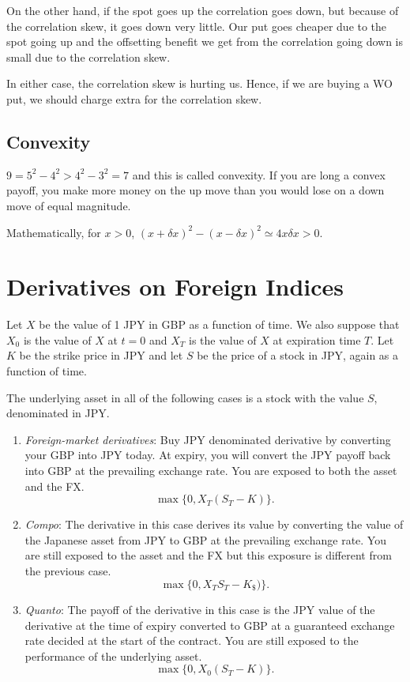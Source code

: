 \documentclass{amsart}
\theoremstyle{plain}
\numberwithin{equation}{section}
\begin{document}
On the other hand, if the spot goes up the correlation 
goes down, but because of the correlation skew,
it goes down very little. Our put goes cheaper due to 
the spot going up and the offsetting 
benefit we get from the correlation going down
is small due to the correlation skew.

In either case, the correlation skew is hurting us.
Hence, if we are buying a WO put, we should
charge extra for the correlation skew.
\subsection{Convexity}
$9 = 5^2 - 4^2 > 4^2 - 3^2 = 7$ and this is called convexity.
If you are long a convex payoff, you make more money 
on the up move than you would lose on a down move of equal magnitude.

Mathematically, for $x>0$,
$(x+\delta x)^2 - (x - \delta x )^2 \simeq 4x\delta x > 0$.

\section*{Derivatives on Foreign Indices}
Let $X$ be the value of 1 JPY in GBP as
a function of time. We also suppose that 
$X_0$ is the value of $X$ at $t=0$ and 
$X_T$ is the value of $X$ at expiration time $T$.
Let $K$ be the strike price in JPY and 
let $S$ be the price of a stock in JPY, again
as a function of time. 

The underlying asset in all of the following cases
is a stock with the value $S$, denominated in JPY. 

\begin{enumerate}
\item \emph{Foreign-market derivatives}:
Buy JPY denominated derivative by converting 
your GBP into JPY today. At expiry, 
you will convert the JPY payoff back
into GBP at the prevailing exchange rate.
You are exposed to both the asset and 
the FX.
\begin{equation}
\max\{0, X_T(S_T - K)\}.
\end{equation}
\item \emph{Compo}:
The derivative in this case
derives its value by converting the value 
of the Japanese asset from JPY to 
GBP at the prevailing exchange 
rate. You are still exposed to the 
asset and the FX but this exposure 
is different from the previous case.
\begin{equation}
\max\{0, X_T S_T - K_{\$})\}.
\end{equation}


\item \emph{Quanto}: The payoff of the 
derivative in this case is the
JPY value of the derivative at the 
time of expiry
converted to GBP at a guaranteed
exchange rate decided at the start 
of the contract. You are still exposed
to the performance of the underlying asset.
\begin{equation}
\max\{0, X_0(S_T - K)\}.
\end{equation}

\end{enumerate}
\end{document}
